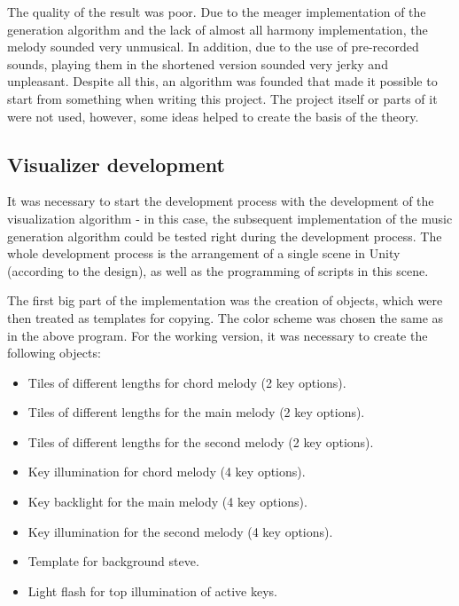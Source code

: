 \documentclass[thesis=B,english]{FITthesis}[2019/12/23]
\begin{document}
The quality of the result was poor. Due to the meager implementation of the generation algorithm and the lack of almost all harmony implementation, the melody sounded very unmusical. In addition, due to the use of pre-recorded sounds, playing them in the shortened version sounded very jerky and unpleasant. Despite all this, an algorithm was founded that made it possible to start from something when writing this project. The project itself or parts of it were not used, however, some ideas helped to create the basis of the theory.

\subsection{Visualizer development}

It was necessary to start the development process with the development of the visualization algorithm - in this case, the subsequent implementation of the music generation algorithm could be tested right during the development process. The whole development process is the arrangement of a single scene in Unity (according to the design), as well as the programming of scripts in this scene.

The first big part of the implementation was the creation of objects, which were then treated as templates for copying. The color scheme was chosen the same as in the above program. For the working version, it was necessary to create the following objects:
\begin{itemize}
    \item Tiles of different lengths for chord melody (2 key options).
    \item Tiles of different lengths for the main melody (2 key options).
    \item Tiles of different lengths for the second melody (2 key options).
    \item Key illumination for chord melody (4 key options).
    \item Key backlight for the main melody (4 key options).
    \item Key illumination for the second melody (4 key options).
    \item Template for background steve.
    \item Light flash for top illumination of active keys.
\end{itemize}
\end{document}
